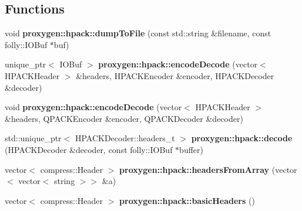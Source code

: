 \subsection*{Functions}
\begin{DoxyCompactItemize}
\item 
void {\bf proxygen\+::hpack\+::dump\+To\+File} (const std\+::string \&filename, const folly\+::\+I\+O\+Buf $\ast$buf)
\item 
unique\+\_\+ptr$<$ I\+O\+Buf $>$ {\bf proxygen\+::hpack\+::encode\+Decode} (vector$<$ H\+P\+A\+C\+K\+Header $>$ \&headers, H\+P\+A\+C\+K\+Encoder \&encoder, H\+P\+A\+C\+K\+Decoder \&decoder)
\item 
void {\bf proxygen\+::hpack\+::encode\+Decode} (vector$<$ H\+P\+A\+C\+K\+Header $>$ \&headers, Q\+P\+A\+C\+K\+Encoder \&encoder, Q\+P\+A\+C\+K\+Decoder \&decoder)
\item 
std\+::unique\+\_\+ptr$<$ H\+P\+A\+C\+K\+Decoder\+::headers\+\_\+t $>$ {\bf proxygen\+::hpack\+::decode} (H\+P\+A\+C\+K\+Decoder \&decoder, const folly\+::\+I\+O\+Buf $\ast$buffer)
\item 
vector$<$ compress\+::\+Header $>$ {\bf proxygen\+::hpack\+::headers\+From\+Array} (vector$<$ vector$<$ string $>$$>$ \&a)
\item 
vector$<$ compress\+::\+Header $>$ {\bf proxygen\+::hpack\+::basic\+Headers} ()
\end{DoxyCompactItemize}
